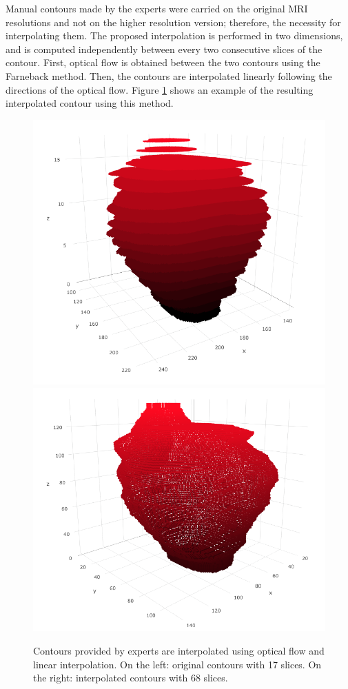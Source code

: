 Manual contours made by the experts were carried on the original MRI
resolutions and not on the higher resolution version; therefore, 
the necessity for interpolating them. 
The proposed interpolation is performed in two dimensions, and
is computed independently between every two consecutive slices of the contour. First, optical flow is obtained between the two contours using the  
Farneback method. Then, the contours are interpolated linearly following
the directions of the optical flow. Figure \ref{fig:of1} shows an
example of the resulting interpolated contour using this method. 
\begin{figure}[h]
    \centering
    \includegraphics[totalheight=.15\textheight]{imgs/methodology/OF_1.png}
    \includegraphics[totalheight=.15\textheight]{imgs/methodology/OF_2.png}
    \caption{Contours provided by experts are interpolated using optical flow and
    linear interpolation. On the left:
    original contours with 17 slices. On the right: interpolated contours with 68 slices.}
    \label{fig:of1}
\end{figure}

